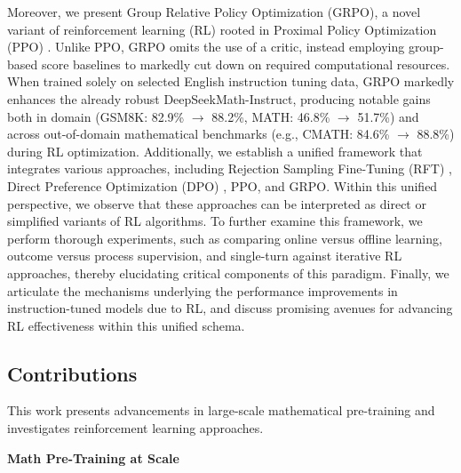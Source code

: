Moreover, we present Group Relative Policy Optimization (GRPO), a novel variant of reinforcement learning (RL) rooted in Proximal Policy Optimization (PPO) \citep{schulman2017proximal}. Unlike PPO, GRPO omits the use of a critic, instead employing group-based score baselines to markedly cut down on required computational resources. When trained solely on selected English instruction tuning data, GRPO markedly enhances the already robust DeepSeekMath-Instruct, producing notable gains both in domain (GSM8K: 82.9\% $\rightarrow$ 88.2\%, MATH: 46.8\% $\rightarrow$ 51.7\%) and across out-of-domain mathematical benchmarks (e.g., CMATH: 84.6\% $\rightarrow$ 88.8\%) during RL optimization. Additionally, we establish a unified framework that integrates various approaches, including Rejection Sampling Fine-Tuning (RFT) \citep{yuan2023scaling}, Direct Preference Optimization (DPO) \citep{dpo}, PPO, and GRPO. Within this unified perspective, we observe that these approaches can be interpreted as direct or simplified variants of RL algorithms. To further examine this framework, we perform thorough experiments, such as comparing online versus offline learning, outcome versus process supervision, and single-turn against iterative RL approaches, thereby elucidating critical components of this paradigm. Finally, we articulate the mechanisms underlying the performance improvements in instruction-tuned models due to RL, and discuss promising avenues for advancing RL effectiveness within this unified schema.

\subsection{Contributions}
This work presents advancements in large-scale mathematical pre-training and investigates reinforcement learning approaches.

\textbf{Math Pre-Training at Scale}

